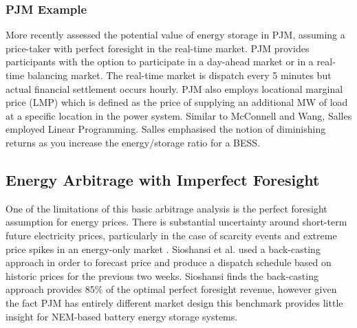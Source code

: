\subsubsection{PJM Example}
More recently \parencite{SallesPJM} assessed the potential value of energy storage in PJM, assuming a price-taker with perfect foresight in the real-time market. PJM provides participants with the option to participate in a day-ahead market or in a real-time balancing market. The real-time market is dispatch every 5 minutes but actual financial settlement occurs hourly. PJM also employs locational marginal price (LMP) which is defined as the price of supplying an additional MW of
load at a specific location in the power system. Similar to McConnell and Wang, Salles employed Linear Programming. Salles emphasised the notion of diminishing returns as you increase the energy/storage ratio for a BESS.
\subsection{ Energy Arbitrage with Imperfect Foresight }
One of the limitations of this basic arbitrage analysis is the perfect foresight assumption for energy prices. There is substantial uncertainty around short-term future electricity prices, particularly in the case of scarcity events and extreme price spikes in an energy-only market \parencite{McConnell}. 
Sioshansi et al. used a back-casting approach in order to forecast price and produce a dispatch schedule based on historic prices for the previous two weeks. Sioshansi finds the back-casting approach provides 85\% of the optimal perfect foresight revenue, however given the fact PJM has entirely different market design this benchmark provides little insight for NEM-based battery energy storage systems. 

